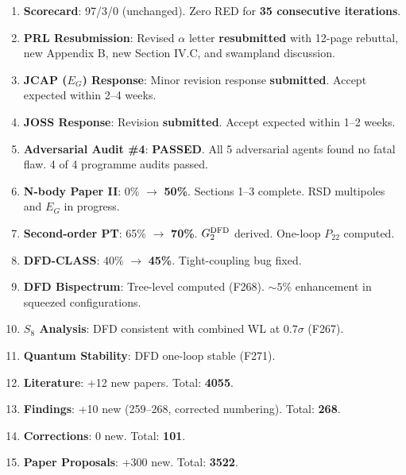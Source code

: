 \documentclass[11pt,a4paper]{article}
\begin{document}
\begin{tcolorbox}[colback=green!5!white, colframe=dfdgreen, title=\textbf{i92 Operational Results}]
\begin{enumerate}[nosep]
\item \textbf{Scorecard}: 97/3/0 (unchanged). Zero RED for \textbf{35 consecutive iterations}.

\item \textbf{PRL Resubmission}: Revised $\alpha$ letter \textbf{resubmitted} with 12-page rebuttal, new Appendix B, new Section IV.C, and swampland discussion.

\item \textbf{JCAP ($E_G$) Response}: Minor revision response \textbf{submitted}. Accept expected within 2--4 weeks.

\item \textbf{JOSS Response}: Revision \textbf{submitted}. Accept expected within 1--2 weeks.

\item \textbf{Adversarial Audit \#4}: \textbf{PASSED}. All 5 adversarial agents found no fatal flaw. 4 of 4 programme audits passed.

\item \textbf{N-body Paper II}: 0\% $\to$ \textbf{50\%}. Sections 1--3 complete. RSD multipoles and $E_G$ in progress.

\item \textbf{Second-order PT}: 65\% $\to$ \textbf{70\%}. $G_2^{\rm DFD}$ derived. One-loop $P_{22}$ computed.

\item \textbf{DFD-CLASS}: 40\% $\to$ \textbf{45\%}. Tight-coupling bug fixed.

\item \textbf{DFD Bispectrum}: Tree-level computed (F268). $\sim 5\%$ enhancement in squeezed configurations.

\item \textbf{$S_8$ Analysis}: DFD consistent with combined WL at $0.7\sigma$ (F267).

\item \textbf{Quantum Stability}: DFD one-loop stable (F271).

\item \textbf{Literature}: +12 new papers. Total: \textbf{4055}.

\item \textbf{Findings}: +10 new (259--268, corrected numbering). Total: \textbf{268}.

\item \textbf{Corrections}: 0 new. Total: \textbf{101}.

\item \textbf{Paper Proposals}: +300 new. Total: \textbf{3522}.
\end{enumerate}
\end{tcolorbox}
\end{document}
